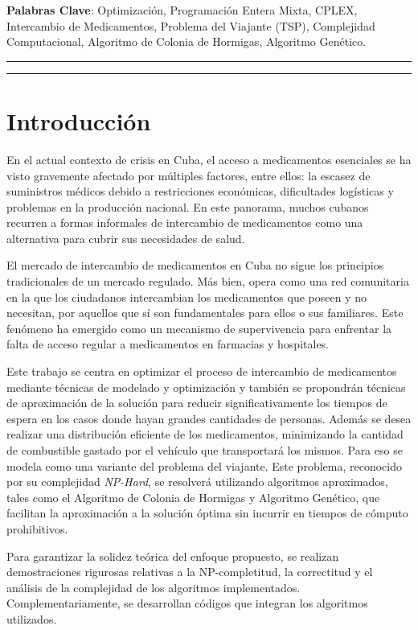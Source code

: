 \documentclass[twocolumn, fontsize=10pt]{article}
\theoremstyle{definition} %
\begin{document}
\noindent \textbf{Palabras Clave}: Optimización, Programación Entera Mixta, CPLEX, Intercambio de Medicamentos, Problema del Viajante (TSP), Complejidad Computacional, Algoritmo de Colonia de Hormigas, Algoritmo Genético.


\rule{\linewidth}{0.5pt}

\newpage

\tableofcontents

\rule{\linewidth}{0.5pt}

\section{Introducción}

En el actual contexto de crisis en Cuba, el acceso a medicamentos esenciales se ha visto gravemente afectado por múltiples factores, entre ellos: la escasez de suministros médicos debido a restricciones económicas, dificultades logísticas y problemas en la producción nacional. En este panorama, muchos cubanos recurren a formas informales de intercambio de medicamentos como una alternativa para cubrir sus necesidades de salud.  

El mercado de intercambio de medicamentos en Cuba no sigue los principios tradicionales de un mercado regulado. Más bien, opera como una red comunitaria en la que los ciudadanos intercambian los medicamentos que poseen y no necesitan, por aquellos que sí son fundamentales para ellos o sus familiares. Este fenómeno ha emergido como un mecanismo de supervivencia para enfrentar la falta de acceso regular a medicamentos en farmacias y hospitales.

Este trabajo se centra en optimizar el proceso de intercambio de medicamentos mediante técnicas de modelado y optimización y también se propondrán técnicas de aproximación de la solución para reducir significativamente los tiempos de espera en los casos donde hayan grandes cantidades de personas.  Además se desea realizar una distribución eficiente de los medicamentos, minimizando la cantidad de combustible gastado por el vehículo que transportará los mismos. Para eso se modela como una variante del problema del viajante. Este problema, reconocido por su complejidad \textit{NP-Hard}, se resolverá utilizando algoritmos aproximados, tales como el Algoritmo de Colonia de Hormigas y Algoritmo Genético, que facilitan la aproximación a la solución óptima sin incurrir en tiempos de cómputo prohibitivos.

Para garantizar la solidez teórica del enfoque propuesto, se realizan demostraciones rigurosas relativas a la NP-completitud, la correctitud y el análisis de la complejidad de los algoritmos implementados. Complementariamente, se desarrollan códigos que integran los algoritmos utilizados.
\end{document}

